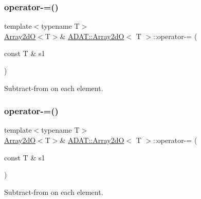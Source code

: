 \subsubsection{\texorpdfstring{operator-\/=()}{operator-=()}\hspace{0.1cm}{\footnotesize\ttfamily [5/6]}}
{\footnotesize\ttfamily template$<$typename T$>$ \\
\mbox{\hyperlink{classADAT_1_1Array2dO}{Array2dO}}$<$T$>$\& \mbox{\hyperlink{classADAT_1_1Array2dO}{A\+D\+A\+T\+::\+Array2dO}}$<$ T $>$\+::operator-\/= (\begin{DoxyParamCaption}\item[{const T \&}]{s1 }\end{DoxyParamCaption})\hspace{0.3cm}{\ttfamily [inline]}}



Subtract-\/from on each element. 

\mbox{\label{classADAT_1_1Array2dO_a5facf357c8c8f28555fe851dce2d039c}} 
\subsubsection{\texorpdfstring{operator-\/=()}{operator-=()}\hspace{0.1cm}{\footnotesize\ttfamily [6/6]}}
{\footnotesize\ttfamily template$<$typename T$>$ \\
\mbox{\hyperlink{classADAT_1_1Array2dO}{Array2dO}}$<$T$>$\& \mbox{\hyperlink{classADAT_1_1Array2dO}{A\+D\+A\+T\+::\+Array2dO}}$<$ T $>$\+::operator-\/= (\begin{DoxyParamCaption}\item[{const T \&}]{s1 }\end{DoxyParamCaption})\hspace{0.3cm}{\ttfamily [inline]}}



Subtract-\/from on each element. 

\mbox{\label{classADAT_1_1Array2dO_a04e77d7a878bbf9ecf4e890848f09009}} 
